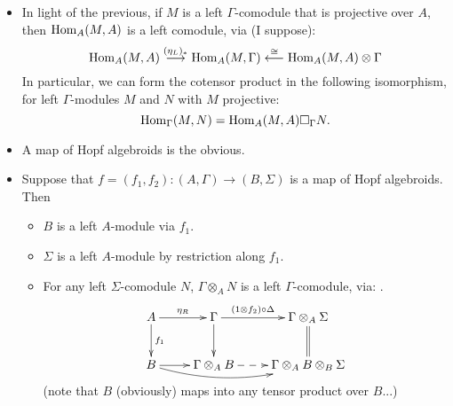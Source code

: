 \documentclass[11pt]{article}
\begin{document}
\begin{Gamma-comodules}
\begin{itemize}
\item In light of the previous, if $M$ is a left $\Gamma$-comodule that is projective over $A$, then $\operatorname{Hom}_A(M,A)$ is a left comodule, via (I suppose):
\[\operatorname{Hom}_A(M,A)\overset{(\eta_L)_*}{\longrightarrow}\operatorname{Hom}_A(M,\Gamma)\overset{\cong}{\longleftarrow} \operatorname{Hom}_A(M,A)\otimes\Gamma\]
In particular, we can form the cotensor product in the following isomorphism, for left $\Gamma$-modules $M$ and $N$ with $M$ projective:
\[\operatorname{Hom}_\Gamma(M,N)=\operatorname{Hom}_{A}(M,A)\square_\Gamma N.\]
\end{itemize}
\end{Gamma-comodules}
\begin{Maps of algebroids}
\begin{itemize}\squishlist
\item A map of Hopf algebroids is the obvious.
\item Suppose that $f=(f_1,f_2):(A,\Gamma)\to(B,\Sigma)$ is a map of Hopf algebroids. Then
\begin{itemize}\squishlist
\item $B$ is a left $A$-module via $f_1$.
\item $\Sigma$ is a left $A$-module by restriction along $f_1$.
\item For any left $\Sigma$-comodule $N$, $\Gamma\otimes_AN$ is a left $\Gamma$-comodule, via: %
.
\[\xymatrix{
A\ar[r]^-{\eta_R}\ar[d]^-{f_1}&%
\Gamma\ar[d]\ar[r]^-{(1\otimes f_2)\circ\Delta}&%
\Gamma\otimes_A\Sigma\ar@{=}[d]\\%
B\ar@/_1em/[rr]\ar[r]&%
\Gamma\otimes_AB\ar@{-->}[r]&%
\Gamma\otimes_A B\otimes_B\Sigma
}\]
(note that $B$ (obviously) maps into any tensor product over $B$...)
\end{itemize}

\end{itemize}

\end{Maps of algebroids}
\end{document}
